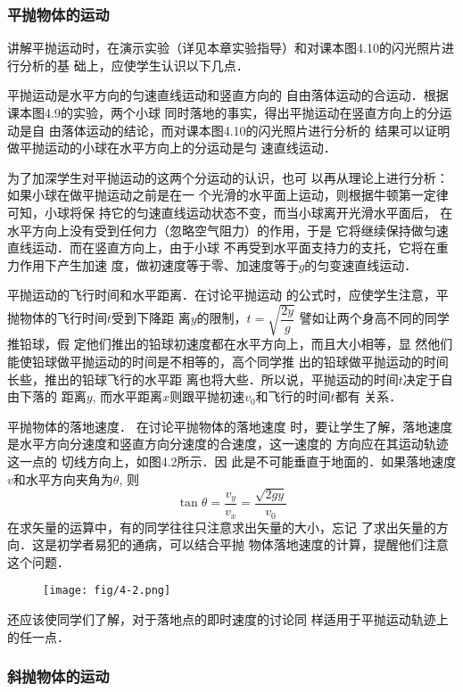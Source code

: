 \subsubsection{平抛物体的运动}

讲解平抛运动时，在演示实验（详见本章实验指导）和对课本图4.10的闪光照片进行分析的基
础上，应使学生认识以下几点．

平抛运动是水平方向的匀速直线运动和竖直方向的
自由落体运动的合运动．根据课本图4.9的实验，两个小球
同时落地的事实，得出平抛运动在竖直方向上的分运动是自
由落体运动的结论，而对课本图4.10的闪光照片进行分析的
结果可以证明做平抛运动的小球在水平方向上的分运动是匀
速直线运动．

为了加深学生对平抛运动的这两个分运动的认识，也可
以再从理论上进行分析：如果小球在做平抛运动之前是在一
个光滑的水平面上运动，则根据牛顿第一定律可知，小球将保
持它的匀速直线运动状态不变，而当小球离开光滑水平面后，
在水平方向上没有受到任何力（忽略空气阻力）的作用，于是
它将继续保持做匀速直线运动．而在竖直方向上，由于小球
不再受到水平面支持力的支托，它将在重力作用下产生加速
度，做初速度等于零、加速度等于$g$的匀变速直线运动．

平抛运动的飞行时间和水平距离．在讨论平抛运动
的公式时，应使学生注意，平抛物体的飞行时间$t$受到下降距
离$y$的限制，$t=\sqrt{\dfrac{2y}{g}}$
譬如让两个身高不同的同学推铅球，假
定他们推出的铅球初速度都在水平方向上，而且大小相等，显
然他们能使铅球做平抛运动的时间是不相等的，高个同学推
出的铅球做平抛运动的时间长些，推出的铅球飞行的水平距
离也将大些．所以说，平抛运动的时间$t$决定于自由下落的
距离$y$, 而水平距离$x$则跟平抛初速$v_0$和飞行的时间$t$都有
关系．

平抛物体的落地速度．
在讨论平抛物体的落地速度
时，要让学生了解，落地速度
是水平方向分速度和竖直方向分速度的合速度，这一速度的
方向应在其运动轨迹这一点的
切线方向上，如图4.2所示．因
此是不可能垂直于地面的．如果落地速度$v$和水平方向夹角为$\theta$, 则\[\tan\theta= \frac{v_y}{v_x}=\frac{\sqrt{2gy}}{v_0} \]
在求矢量的运算中，有的同学往往只注意求出矢量的大小，忘记
了求出矢量的方向．这是初学者易犯的通病，可以结合平抛
物体落地速度的计算，提醒他们注意这个问题．

\begin{figure}[htp]
    \centering
\texttt{[image: fig/4-2.png]}
    \caption{}
\end{figure}

还应该使同学们了解，对于落地点的即时速度的讨论同
样适用于平抛运动轨迹上的任一点．

\subsubsection{斜抛物体的运动}

